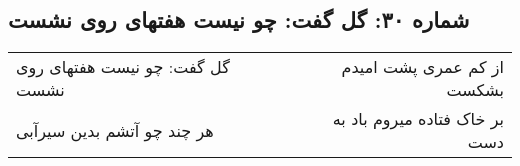 \begin{center}
\section*{شماره ۳۰: گل گفت: چو نیست هفتهای روی نشست}
\label{sec:030}
\begin{longtable}{l p{0.5cm} r}
گل گفت: چو نیست هفتهای روی نشست
&&
از کم عمری پشت امیدم بشکست
\\
هر چند چو آتشم بدین سیرآبی
&&
بر خاک فتاده میروم باد به دست
\\
\end{longtable}
\end{center}
